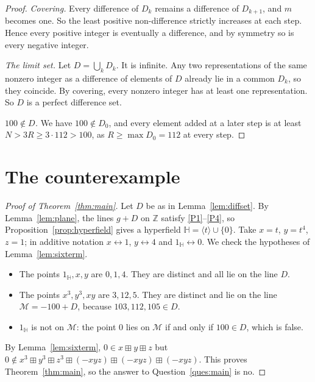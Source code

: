 \documentclass[11pt]{article}
\theoremstyle{definition}
\theoremstyle{remark}
\newcommand{\HH}{\mathbb{H}}
\newcommand{\Z}{\mathbb{Z}}
\newcommand{\bp}{\boxplus}
\begin{document}
\begin{proof}
\emph{Covering.} Every difference of $D_k$ remains a difference of $D_{k+1}$, and $m$ becomes one. So the least positive non-difference strictly increases at each step. Hence every positive integer is eventually a difference, and by symmetry so is every negative integer.


\emph{The limit set.} Let $D=\bigcup_k D_k$. It is infinite. Any two representations of the same nonzero integer as a difference of elements of $D$ already lie in a common $D_k$, so they coincide. By covering, every nonzero integer has at least one representation. So $D$ is a perfect difference set.

\emph{$100\notin D$.} We have $100\notin D_0$, and every element added at a later step is at least $N>3R\ge3\cdot112>100$, as $R\ge\max D_0=112$ at every step.
\end{proof}

\section{The counterexample}

\begin{proof}[Proof of Theorem~\ref{thm:main}]
Let $D$ be as in Lemma~\ref{lem:diffset}. By Lemma~\ref{lem:plane}, the lines $g+D$ on $\Z$ satisfy \ref{P1}--\ref{P4}, so Proposition~\ref{prop:hyperfield} gives a hyperfield $\HH=\langle t\rangle\cup\{0\}$. Take $x=t$, $y=t^4$, $z=1$; in additive notation $x\leftrightarrow1$, $y\leftrightarrow4$ and $1_{\HH}\leftrightarrow0$. We check the hypotheses of Lemma~\ref{lem:sixterm}.
\begin{itemize}[nosep]
\item The points $1_{\HH},x,y$ are $0,1,4$. They are distinct and all lie on the line $D$.
\item The points $x^3,y^3,xy$ are $3,12,5$. They are distinct and lie on the line $\mathcal M=-100+D$, because $103,112,105\in D$.
\item $1_{\HH}$ is not on $\mathcal M$: the point $0$ lies on $\mathcal M$ if and only if $100\in D$, which is false.
\end{itemize}
By Lemma~\ref{lem:sixterm}, $0\in x\bp y\bp z$ but $0\notin x^3\bp y^3\bp z^3\bp(-xyz)\bp(-xyz)\bp(-xyz)$. This proves Theorem~\ref{thm:main}, so the answer to Question~\ref{ques:main} is no.
\end{proof}
\end{document}

